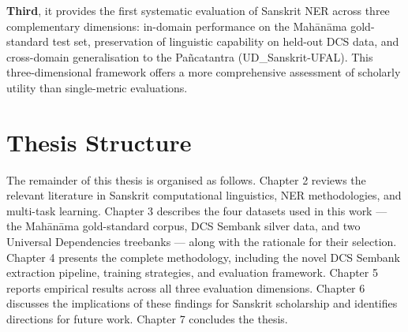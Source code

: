\textbf{Third}, it provides the first systematic evaluation of Sanskrit NER across three complementary dimensions: in-domain performance on the Mahānāma gold-standard test set, preservation of linguistic capability on held-out DCS data, and cross-domain generalisation to the Pañcatantra \cite{pancatantra_text} (UD\_Sanskrit-UFAL). This three-dimensional framework offers a more comprehensive assessment of scholarly utility than single-metric evaluations.

\section{Thesis Structure}
\label{sec:structure}

The remainder of this thesis is organised as follows. Chapter 2 reviews the relevant literature in Sanskrit computational linguistics, NER methodologies, and multi-task learning. Chapter 3 describes the four datasets used in this work — the Mahānāma gold-standard corpus, DCS Sembank silver data, and two Universal Dependencies treebanks — along with the rationale for their selection. Chapter 4 presents the complete methodology, including the novel DCS Sembank extraction pipeline, training strategies, and evaluation framework. Chapter 5 reports empirical results across all three evaluation dimensions. Chapter 6 discusses the implications of these findings for Sanskrit scholarship and identifies directions for future work. Chapter 7 concludes the thesis.


